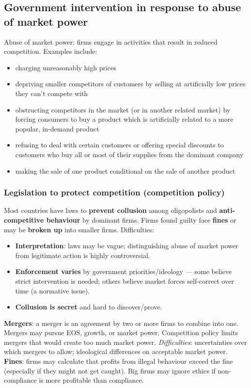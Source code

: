 \subsection{Government intervention in response to abuse of market power}
Abuse of market power: firms engage in activities that result in reduced competition. Examples include:
\begin{itemize}
  \item charging unreasonably high prices
  \item depriving smaller competitors of customers by selling at artificially low prices they can't compete with
  \item obstructing competitors in the market (or in another related market) by forcing consumers to buy a product which is artificially related to a more popular, in-demand product
  \item refusing to deal with certain customers or offering special discounts to customers who buy all or most of their supplies from the dominant company
  \item making the sale of one product conditional on the sale of another product
\end{itemize}
\subsubsection*{Legislation to protect competition (competition policy)}
Most countries have laws to \textbf{prevent collusion} among oligopolists and \textbf{anti-competitive behaviour} by dominant firms. Firms found guilty face \textbf{fines} or may be \textbf{broken up} into smaller firms. Difficulties:
\begin{itemize}
  \item \textbf{Interpretation}: laws may be vague; distinguishing abuse of market power from legitimate action is highly controversial.
  \item \textbf{Enforcement varies} by government priorities/ideology --- some believe strict intervention is needed; others believe market forces self-correct over time (a normative issue).
  \item \textbf{Collusion is secret} and hard to discover/prove.
\end{itemize}
\textbf{Mergers}: a merger is an agreement by two or more firms to combine into one. Mergers may pursue EOS, growth, or market power. Competition policy limits mergers that would create too much market power. \textit{Difficulties}: uncertainties over which mergers to allow; ideological differences on acceptable market power.
\\
\textbf{Fines}: firms may calculate that profits from illegal behaviour exceed the fine (especially if they might not get caught). Big firms may ignore ethics if non-compliance is more profitable than compliance.
